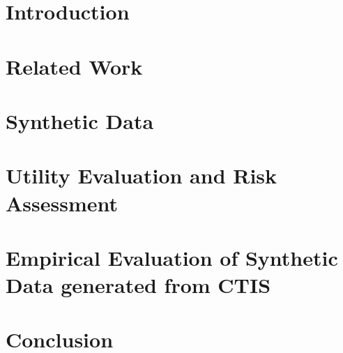 \documentclass[12pt]{article}
\begin{document}
\newpage
\tableofcontents

\clearpage
{}
\listoffigures \newpage
{}
\listoftables \newpage


    
\section{Introduction}
\label{chapter1:intro}

\newpage

\section{Related Work}
\label{chapter2:relatedwork}

\newpage

\section{Synthetic Data}
\label{chapter3:syn}

\newpage

\section{Utility Evaluation and Risk Assessment}
\label{chapter4:eva}

\newpage

\section{Empirical Evaluation of Synthetic Data generated from CTIS}
\label{chapter5:ctis}

\newpage

% 

\section{Conclusion}
\label{chapter6:conclusion}

\end{document}
